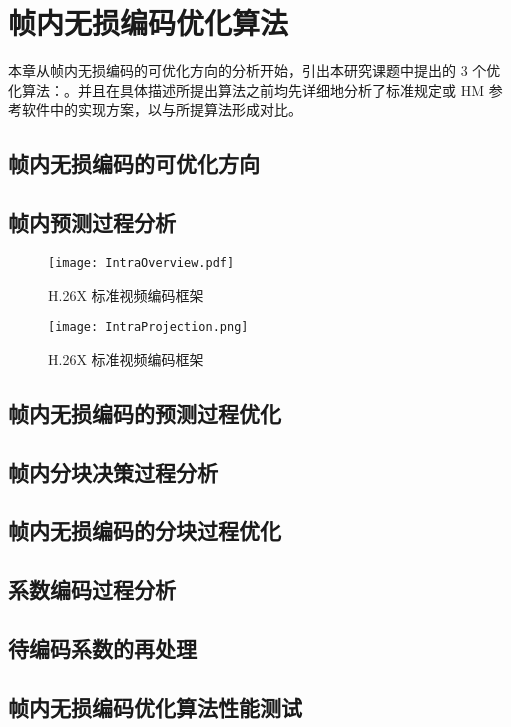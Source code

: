 \chapter{帧内无损编码优化算法}
\label{cha:c3}
本章从帧内无损编码的可优化方向的分析开始，引出本研究课题中提出的 3 个优化算法：。并且在具体描述所提出算法之前均先详细地分析了标准规定或 HM 参考软件中的实现方案，以与所提算法形成对比。

\section{帧内无损编码的可优化方向}

\section{帧内预测过程分析}
\label{cha:IntraPredDetail}

\begin{figure}[hbt]
    \centering
    \texttt{[image: IntraOverview.pdf]}
    \caption{H.26X 标准视频编码框架}
    \label{fig:IntraOverview}
\end{figure}

\begin{figure}[hbt]
    \centering
    \texttt{[image: IntraProjection.png]}
    \caption{H.26X 标准视频编码框架}
    \label{fig:IntraProjection}
\end{figure}

\section{帧内无损编码的预测过程优化}

\section{帧内分块决策过程分析}

\section{帧内无损编码的分块过程优化}

\section{系数编码过程分析}

\section{待编码系数的再处理}

\section{帧内无损编码优化算法性能测试}